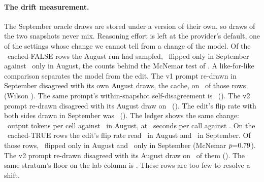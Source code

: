 \paragraph{The drift measurement.} The September oracle draws are
stored under a version of their own, so draws of the two snapshots
never mix. Reasoning effort is left at the provider's default, one of
the settings whose change we cannot tell from a change of the model. Of
the \driftFalseRows\ cached-FALSE rows the August run had sampled,
\driftFalseOnlySep\ flipped only in September against
\driftFalseOnlyAug\ only in August, the counts behind the McNemar test
of .
A like-for-like comparison separates the model from the edit. The
v1 prompt re-drawn in September disagreed with its own August
draws, the cache, on \driftFalseCache\ of those rows (Wilson
\driftFalseCacheCi). The same prompt's within-snapshot self-disagreement
is \floorFalseStratum\ (\floorFalseCi). The v2 prompt re-drawn disagreed
with its August draw on \driftFalsePrompt\ (\driftFalsePromptCi).
The edit's flip rate with both sides drawn in September was
\driftFalseFresh\ (\driftFalseFreshCi). The ledger shows the same
change: \driftTokensSep\ output tokens
per cell against \driftTokensAug\ in August, at \driftLatencySep\
seconds per call against \driftLatencyAug. On the
\driftTrueRows\ cached-TRUE rows the edit's flip rate read
\driftTrueAugEdit\ in August and \driftTrueSepEdit\ in September.
Of those rows, \driftTrueOnlyAug\ flipped only in August and
\driftTrueOnlySep\ only in September (McNemar $p{=}0.79$).
The v2 prompt re-drawn disagreed with its August draw on
\driftTruePrompt\ of them (\driftTruePromptCi). The same stratum's
floor on the lab column is \floorTrueStratum. These rows are too few to
resolve a shift.

\keeprunin
